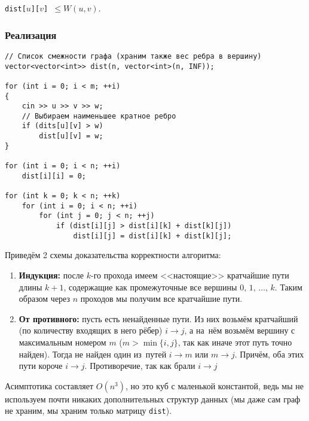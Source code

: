 \begin{lemma}
    \textnormal{\texttt{dist[$u$][$v$] $\leqslant W(u, v)$}}.
\end{lemma}

\subsubsection{Реализация}

\begin{verbatim}
// Список смежности графа (храним также вес ребра в вершину)
vector<vector<int>> dist(n, vector<int>(n, INF));

for (int i = 0; i < m; ++i)
{
    cin >> u >> v >> w;
    // Выбираем наименьшее кратное ребро
    if (dits[u][v] > w)
        dist[u][v] = w;
}

for (int i = 0; i < n; ++i)
    dist[i][i] = 0;

for (int k = 0; k < n; ++k)
    for (int i = 0; i < n; ++i)
        for (int j = 0; j < n; ++j)
            if (dist[i][j] > dist[i][k] + dist[k][j])
                dist[i][j] = dist[i][k] + dist[k][j];
\end{verbatim}

Приведём 2 схемы доказательства корректности алгоритма:

\begin{enumerate}
    \item \textbf{Индукция: } после $k$-го прохода имеем <<настоящие>> кратчайшие пути длины $k+1$, содержащие как промежуточные все вершины $0,\, 1,\,\ldots,\,k$. Таким образом через $n$ проходов мы получим все кратчайшие пути.
    \item \textbf{От противного:} пусть есть ненайденные пути. Из них возьмём кратчайший (по количеству входящих в него рёбер) $i\rightarrow j$, а на~нём возьмём вершину с максимальным номером $m$ ($m > \min\{i, j\}$, так как иначе этот путь точно найден). Тогда не найден один из~путей $i\rightarrow m$ или $m\rightarrow j$. Причём, оба этих пути короче $i\rightarrow j$. Противоречие, так как брали $i\rightarrow j$
\end{enumerate}

Асимптотика составляет $O(n^3)$, но это куб с маленькой константой, ведь мы не используем почти никаких дополнительных структур данных (мы даже сам граф не храним, мы храним только матрицу \texttt{dist}). 

